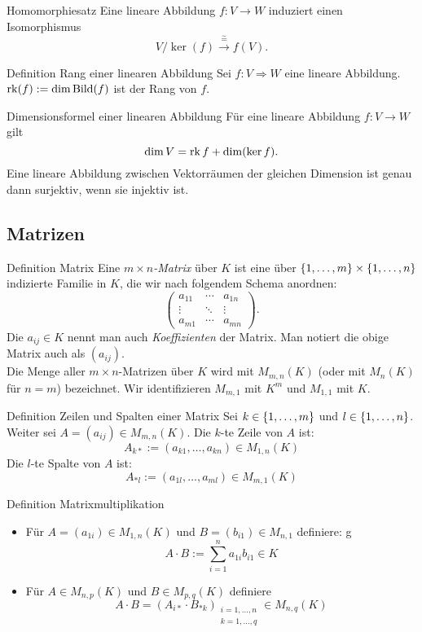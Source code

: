 \documentclass[main.tex]{subfiles}
\begin{document}
\begin{karte}{Homomorphiesatz}
    Eine lineare Abbildung \(f: V \rightarrow W\) 
    induziert einen Isomorphismus
    \[ V/\ker(f) \xrightarrow{\overset{\sim}{=}} f(V). \]
\end{karte}
\begin{karte}{Definition Rang einer linearen Abbildung}
    Sei \(f : V \Rightarrow W\) eine lineare Abbildung. 
    \(\operatorname{rk}(f) := \dim \operatorname{Bild}(f) \) ist der Rang von \(f\).
\end{karte}
\begin{karte}{Dimensionsformel einer linearen Abbildung}
    Für eine lineare Abbildung \( f: V \rightarrow W \) 
    gilt 
    \[ \dim V = \operatorname{rk} f + \dim(\ker f). \]
    Eine lineare Abbildung zwischen Vektorräumen 
    der gleichen Dimension ist genau dann surjektiv, wenn sie 
    injektiv ist.    
\end{karte}
\subsection*{Matrizen}
\begin{karte}{Definition Matrix}
    Eine \textit{\(m \times n\)-Matrix} über \(K\) ist 
    eine über \( \{1,\ldots,m\} \times \{1,\ldots,n\} \) 
    indizierte Familie in \(K\), die wir nach folgendem Schema 
    anordnen:
    \[ \begin{pmatrix}
        a_{11} & \cdots & a_{1n}\\
        \vdots & \ddots & \vdots \\
        a_{m1} & \cdots & a_{mn}
    \end{pmatrix}. \]
    Die \( a_{ij} \in K \) nennt man auch 
    \textit{Koeffizienten} der Matrix. Man notiert die obige 
    Matrix auch als \( (a_{ij}) \). \\
    Die Menge aller \( m \times n \)-Matrizen über \(K\) wird 
    mit \( M_{m,n}(K) \) (oder mit \(M_n(K)\) für \(n=m\)) 
    bezeichnet. Wir identifizieren \( M_{m,1} \) mit \(K^m\) 
    und \( M_{1,1} \) mit \(K\).
\end{karte}
\begin{karte}{Definition Zeilen und Spalten einer Matrix}
    Sei \(k \in \{1, \ldots, m\}\) und \(l \in \{1, \ldots , n\}\).
    Weiter sei \(A = (a_{ij}) \in M_{m,n}(K)\). 
    Die \(k\)-te Zeile von \(A\) ist: 
    \[A_{k*} := (a_{k1},  \ldots, a_{kn}) \in M_{1,n}(K)\]
    Die \(l\)-te Spalte von \(A\) ist:
    \[A_{*l} := (a_{1l}, \ldots , a_{ml}) \in M_{m,1}(K)\]                        
\end{karte}
\begin{karte}{Definition Matrixmultiplikation}
    \begin{itemize}
        \item Für \(A = (a_{1i}) \in M_{1,n}(K)\) und 
        \(B = (b_{i1}) \in M_{n,1}\) definiere: g
        \[A \cdot B := \sum_{i=1}^n a_{1i}b_{i1} \in K\]
        \item Für \(A \in M_{n,p}(K)\) und \(B \in M_{p,q}(K)\) definiere
        \[A \cdot B = {(A_{i*} \cdot B_{*k})}_{\substack{i=1,\ldots,n \\ k=1,\ldots,q}} 
        \in M_{n,q}(K) \]
    \end{itemize}
\end{karte}
\end{document}
